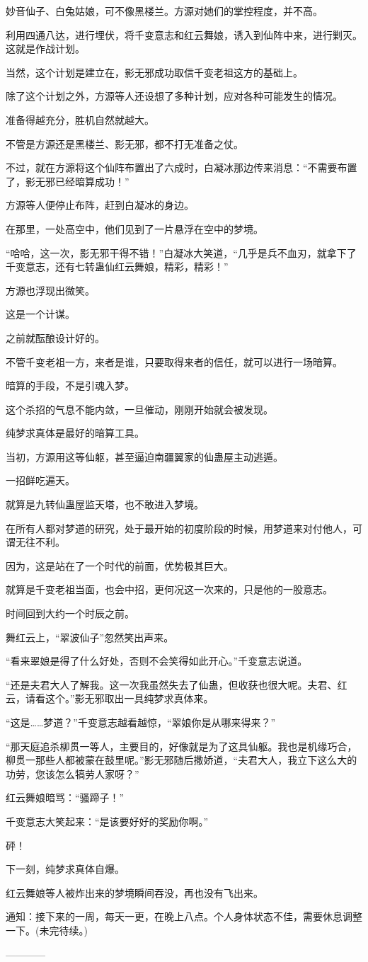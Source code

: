 \begin{this_body}
妙音仙子、白兔姑娘，可不像黑楼兰。方源对她们的掌控程度，并不高。

利用四通八达，进行埋伏，将千变意志和红云舞娘，诱入到仙阵中来，进行剿灭。这就是作战计划。

当然，这个计划是建立在，影无邪成功取信千变老祖这方的基础上。

除了这个计划之外，方源等人还设想了多种计划，应对各种可能发生的情况。

准备得越充分，胜机自然就越大。

不管是方源还是黑楼兰、影无邪，都不打无准备之仗。

不过，就在方源将这个仙阵布置出了六成时，白凝冰那边传来消息：“不需要布置了，影无邪已经暗算成功！”

方源等人便停止布阵，赶到白凝冰的身边。

在那里，一处高空中，他们见到了一片悬浮在空中的梦境。

“哈哈，这一次，影无邪干得不错！”白凝冰大笑道，“几乎是兵不血刃，就拿下了千变意志，还有七转蛊仙红云舞娘，精彩，精彩！”

方源也浮现出微笑。

这是一个计谋。

之前就酝酿设计好的。

不管千变老祖一方，来者是谁，只要取得来者的信任，就可以进行一场暗算。

暗算的手段，不是引魂入梦。

这个杀招的气息不能内敛，一旦催动，刚刚开始就会被发现。

纯梦求真体是最好的暗算工具。

当初，方源用这等仙躯，甚至逼迫南疆翼家的仙蛊屋主动逃遁。

一招鲜吃遍天。

就算是九转仙蛊屋监天塔，也不敢进入梦境。

在所有人都对梦道的研究，处于最开始的初度阶段的时候，用梦道来对付他人，可谓无往不利。

因为，这是站在了一个时代的前面，优势极其巨大。

就算是千变老祖当面，也会中招，更何况这一次来的，只是他的一股意志。

时间回到大约一个时辰之前。

舞红云上，“翠波仙子”忽然笑出声来。

“看来翠娘是得了什么好处，否则不会笑得如此开心。”千变意志说道。

“还是夫君大人了解我。这一次我虽然失去了仙蛊，但收获也很大呢。夫君、红云，请看这个。”影无邪取出一具纯梦求真体来。

“这是……梦道？”千变意志越看越惊，“翠娘你是从哪来得来？”

“那天庭追杀柳贯一等人，主要目的，好像就是为了这具仙躯。我也是机缘巧合，柳贯一那些人都被蒙在鼓里呢。”影无邪随后撒娇道，“夫君大人，我立下这么大的功劳，您该怎么犒劳人家呀？”

红云舞娘暗骂：“骚蹄子！”

千变意志大笑起来：“是该要好好的奖励你啊。”

砰！

下一刻，纯梦求真体自爆。

红云舞娘等人被炸出来的梦境瞬间吞没，再也没有飞出来。

通知：接下来的一周，每天一更，在晚上八点。个人身体状态不佳，需要休息调整一下。(未完待续。)

------------

\end{this_body}

